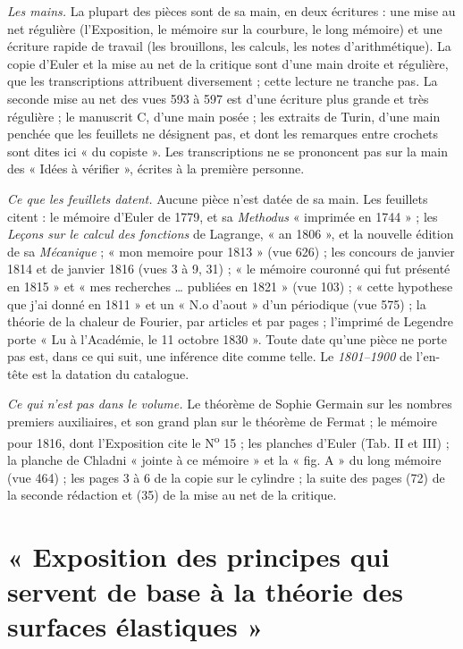 \documentclass[11pt,a4paper]{article}
\begin{document}
\emph{Les mains.} La plupart des pièces sont de sa main, en deux écritures : une
mise au net régulière (l'Exposition, le mémoire sur la courbure, le long mémoire)
et une écriture rapide de travail (les brouillons, les calculs, les notes
d'arithmétique). La copie d'Euler et la mise au net de la critique sont d'une main
droite et régulière, que les transcriptions attribuent diversement ; cette lecture
ne tranche pas. La seconde mise au net des vues 593 à 597 est d'une écriture plus
grande et très régulière ; le manuscrit C, d'une main posée ; les extraits de
Turin, d'une main penchée que les feuillets ne désignent pas, et dont les remarques
entre crochets sont dites ici « du copiste ». Les transcriptions ne se prononcent
pas sur la main des « Idées à vérifier », écrites à la première personne.

\emph{Ce que les feuillets datent.} Aucune pièce n'est datée de sa main. Les
feuillets citent : le mémoire d'Euler de 1779, et sa \emph{Methodus} « imprimée en
1744 » ; les \emph{Leçons sur le calcul des fonctions} de Lagrange, « an 1806 », et
la nouvelle édition de sa \emph{Mécanique} ; « mon memoire pour 1813 » (vue 626) ;
les concours de janvier 1814 et de janvier 1816 (vues 3 à 9, 31) ; « le mémoire
couronné qui fut présenté en 1815 » et « mes recherches … publiées en 1821 » (vue
103) ; « cette hypothese que j'ai donné en 1811 » et un « N.o d'aout » d'un
périodique (vue 575) ; la théorie de la chaleur de Fourier, par articles et par
pages ; l'imprimé de Legendre porte « Lu à l'Académie, le 11 octobre 1830 ». Toute
date qu'une pièce ne porte pas est, dans ce qui suit, une inférence dite comme
telle. Le \emph{1801--1900} de l'en-tête est la datation du catalogue.

\emph{Ce qui n'est pas dans le volume.} Le théorème de Sophie Germain sur les
nombres premiers auxiliaires, et son grand plan sur le théorème de Fermat ; le
mémoire pour 1816, dont l'Exposition cite le N\textsuperscript{o} 15 ; les
planches d'Euler (Tab. II et III) ; la planche de Chladni « jointe à ce mémoire »
et la « fig. A » du long mémoire (vue 464) ; les pages 3 à 6 de la copie sur le
cylindre ; la suite des pages (72) de la seconde rédaction et (35) de la mise au net
de la critique.

\section*{« Exposition des principes qui servent de base à la théorie des surfaces élastiques »}
\end{document}

